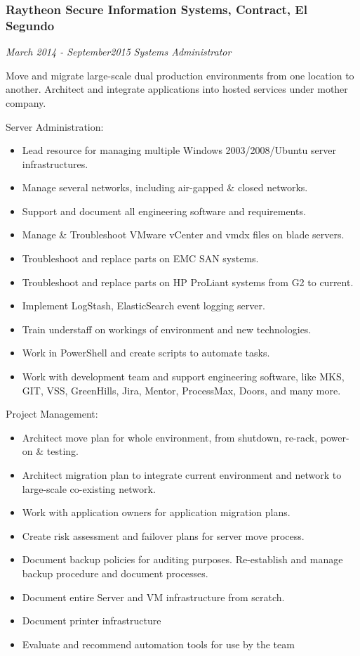\documentclass[]{article}
\providecommand{\tightlist}{%
  \setlength{\itemsep}{0pt}\setlength{\parskip}{0pt}}
\begin{document}
\subsubsection{Raytheon Secure Information Systems, Contract, El
Segundo}\label{raytheon-secure-information-systems-contract-el-segundo}

\emph{March 2014 - September2015} \emph{Systems Administrator}

Move and migrate large-scale dual production environments from one
location to another. Architect and integrate applications into hosted
services under mother company.

Server Administration:

\begin{itemize}
\tightlist
\item
  Lead resource for managing multiple Windows 2003/2008/Ubuntu server
  infrastructures.
\item
  Manage several networks, including air-gapped \& closed networks.
\item
  Support and document all engineering software and requirements.
\item
  Manage \& Troubleshoot VMware vCenter and vmdx files on blade servers.
\item
  Troubleshoot and replace parts on EMC SAN systems.
\item
  Troubleshoot and replace parts on HP ProLiant systems from G2 to
  current.
\item
  Implement LogStash, ElasticSearch event logging server.
\item
  Train understaff on workings of environment and new technologies.
\item
  Work in PowerShell and create scripts to automate tasks.
\item
  Work with development team and support engineering software, like MKS,
  GIT, VSS, GreenHills, Jira, Mentor, ProcessMax, Doors, and many more.
\end{itemize}

Project Management:

\begin{itemize}
\tightlist
\item
  Architect move plan for whole environment, from shutdown, re-rack,
  power-on \& testing.
\item
  Architect migration plan to integrate current environment and network
  to large-scale co-existing network.
\item
  Work with application owners for application migration plans.
\item
  Create risk assessment and failover plans for server move process.
\item
  Document backup policies for auditing purposes. Re-establish and
  manage backup procedure and document processes.
\item
  Document entire Server and VM infrastructure from scratch.
\item
  Document printer infrastructure
\item
  Evaluate and recommend automation tools for use by the team
\end{itemize}
\end{document}
